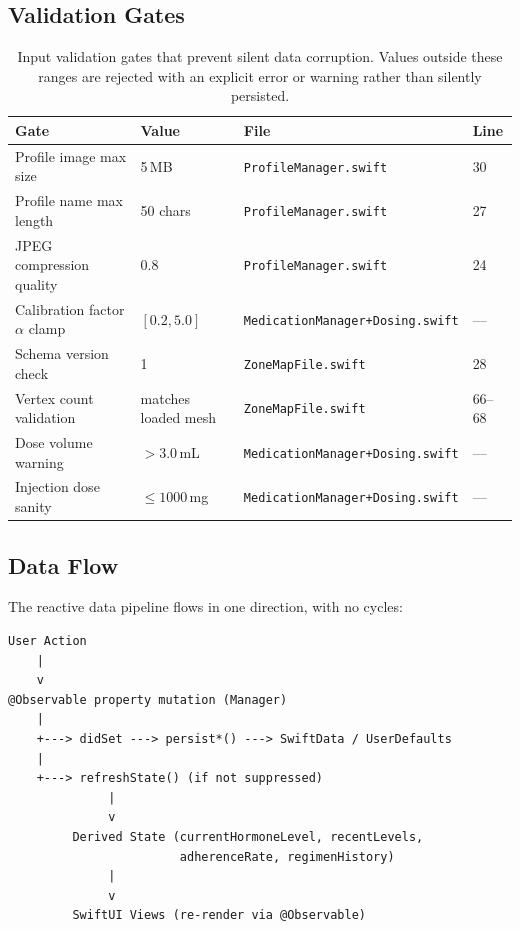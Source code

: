 \documentclass[11pt,a4paper]{article}
\newcommand{\code}[1]{\texttt{\small #1}}
\begin{document}
\subsection{Validation Gates}
\label{sec:validation_gates}

\begin{table}[h]
\centering
\small
\begin{tabular}{@{}p{3.2cm}p{2.4cm}p{4.2cm}p{4.7cm}@{}}
\toprule
\textbf{Gate} & \textbf{Value} & \textbf{File} & \textbf{Line} \\
\midrule
Profile image max size & 5\,MB &
  \code{ProfileManager.swift} & 30 \\
Profile name max length & 50 chars &
  \code{ProfileManager.swift} & 27 \\
JPEG compression quality & 0.8 &
  \code{ProfileManager.swift} & 24 \\
Calibration factor $\alpha$ clamp & $[0.2, 5.0]$ &
  \code{MedicationManager+Dosing.swift} & --- \\
Schema version check & 1 &
  \code{ZoneMapFile.swift} & 28 \\
Vertex count validation & matches loaded mesh &
  \code{ZoneMapFile.swift} & 66--68 \\
Dose volume warning & $> 3.0$\,mL &
  \code{MedicationManager+Dosing.swift} & --- \\
Injection dose sanity & $\leq 1000$\,mg &
  \code{MedicationManager+Dosing.swift} & --- \\
\bottomrule
\end{tabular}
\caption{Input validation gates that prevent silent data corruption. Values
outside these ranges are rejected with an explicit error or warning rather
than silently persisted.}
\label{tab:gates}
\end{table}

\subsection{Data Flow}
\label{sec:data_flow}

The reactive data pipeline flows in one direction, with no cycles:

\begin{verbatim}
User Action
    |
    v
@Observable property mutation (Manager)
    |
    +---> didSet ---> persist*() ---> SwiftData / UserDefaults
    |
    +---> refreshState() (if not suppressed)
              |
              v
         Derived State (currentHormoneLevel, recentLevels,
                        adherenceRate, regimenHistory)
              |
              v
         SwiftUI Views (re-render via @Observable)
\end{verbatim}
\end{document}
